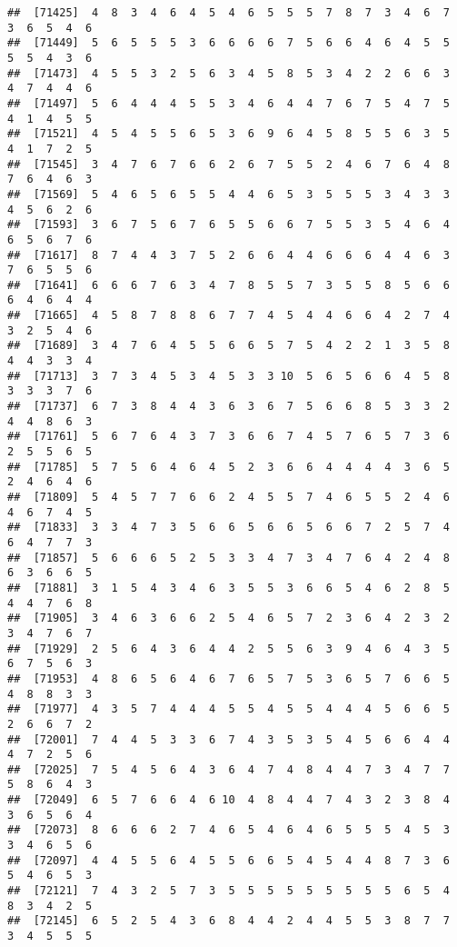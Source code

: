 \documentclass[
]{book}
\begin{document}
\begin{verbatim}
##  [71425]  4  8  3  4  6  4  5  4  6  5  5  5  7  8  7  3  4  6  7  3  6  5  4  6
##  [71449]  5  6  5  5  5  3  6  6  6  6  7  5  6  6  4  6  4  5  5  5  5  4  3  6
##  [71473]  4  5  5  3  2  5  6  3  4  5  8  5  3  4  2  2  6  6  3  4  7  4  4  6
##  [71497]  5  6  4  4  4  5  5  3  4  6  4  4  7  6  7  5  4  7  5  4  1  4  5  5
##  [71521]  4  5  4  5  5  6  5  3  6  9  6  4  5  8  5  5  6  3  5  4  1  7  2  5
##  [71545]  3  4  7  6  7  6  6  2  6  7  5  5  2  4  6  7  6  4  8  7  6  4  6  3
##  [71569]  5  4  6  5  6  5  5  4  4  6  5  3  5  5  5  3  4  3  3  4  5  6  2  6
##  [71593]  3  6  7  5  6  7  6  5  5  6  6  7  5  5  3  5  4  6  4  6  5  6  7  6
##  [71617]  8  7  4  4  3  7  5  2  6  6  4  4  6  6  6  4  4  6  3  7  6  5  5  6
##  [71641]  6  6  6  7  6  3  4  7  8  5  5  7  3  5  5  8  5  6  6  6  4  6  4  4
##  [71665]  4  5  8  7  8  8  6  7  7  4  5  4  4  6  6  4  2  7  4  3  2  5  4  6
##  [71689]  3  4  7  6  4  5  5  6  6  5  7  5  4  2  2  1  3  5  8  4  4  3  3  4
##  [71713]  3  7  3  4  5  3  4  5  3  3 10  5  6  5  6  6  4  5  8  3  3  3  7  6
##  [71737]  6  7  3  8  4  4  3  6  3  6  7  5  6  6  8  5  3  3  2  4  4  8  6  3
##  [71761]  5  6  7  6  4  3  7  3  6  6  7  4  5  7  6  5  7  3  6  2  5  5  6  5
##  [71785]  5  7  5  6  4  6  4  5  2  3  6  6  4  4  4  4  3  6  5  2  4  6  4  6
##  [71809]  5  4  5  7  7  6  6  2  4  5  5  7  4  6  5  5  2  4  6  4  6  7  4  5
##  [71833]  3  3  4  7  3  5  6  6  5  6  6  5  6  6  7  2  5  7  4  6  4  7  7  3
##  [71857]  5  6  6  6  5  2  5  3  3  4  7  3  4  7  6  4  2  4  8  6  3  6  6  5
##  [71881]  3  1  5  4  3  4  6  3  5  5  3  6  6  5  4  6  2  8  5  4  4  7  6  8
##  [71905]  3  4  6  3  6  6  2  5  4  6  5  7  2  3  6  4  2  3  2  3  4  7  6  7
##  [71929]  2  5  6  4  3  6  4  4  2  5  5  6  3  9  4  6  4  3  5  6  7  5  6  3
##  [71953]  4  8  6  5  6  4  6  7  6  5  7  5  3  6  5  7  6  6  5  4  8  8  3  3
##  [71977]  4  3  5  7  4  4  4  5  5  4  5  5  4  4  4  5  6  6  5  2  6  6  7  2
##  [72001]  7  4  4  5  3  3  6  7  4  3  5  3  5  4  5  6  6  4  4  4  7  2  5  6
##  [72025]  7  5  4  5  6  4  3  6  4  7  4  8  4  4  7  3  4  7  7  5  8  6  4  3
##  [72049]  6  5  7  6  6  4  6 10  4  8  4  4  7  4  3  2  3  8  4  3  6  5  6  4
##  [72073]  8  6  6  6  2  7  4  6  5  4  6  4  6  5  5  5  4  5  3  3  4  6  5  6
##  [72097]  4  4  5  5  6  4  5  5  6  6  5  4  5  4  4  8  7  3  6  5  4  6  5  3
##  [72121]  7  4  3  2  5  7  3  5  5  5  5  5  5  5  5  5  6  5  4  8  3  4  2  5
##  [72145]  6  5  2  5  4  3  6  8  4  4  2  4  4  5  5  3  8  7  7  3  4  5  5  5

\end{verbatim}
\end{document}
